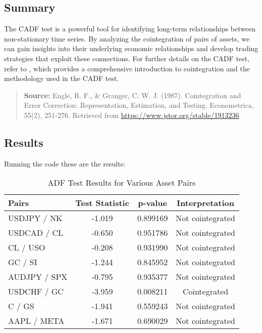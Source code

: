 \documentclass{article}
\begin{document}
\subsection{Summary}
The CADF test is a powerful tool for identifying long-term relationships between non-stationary time series. By analyzing the cointegration of pairs of assets, we can gain insights into their underlying economic relationships and develop trading strategies that exploit these connections.
For further details on the CADF test, refer to \textcite{engle1987cointegration}, which provides a comprehensive introduction to cointegration and the methodology used in the CADF test.

\begin{quote}
\textbf{Source:} Engle, R. F., \& Granger, C. W. J. (1987). Cointegration and Error Correction: Representation, Estimation, and Testing. Econometrica, 55(2), 251-276. Retrieved from \url{https://www.jstor.org/stable/1913236}
\end{quote}

\subsection*{Results}
Running the code these are the results:

\begin{table}[h!]
    \centering
    \begin{tabular}{|l|c|c|c|}
        \hline
        \textbf{Pairs} & \textbf{Test Statistic} & \textbf{p-value} & \textbf{Interpretation} \\
        \hline
        USDJPY / NK & -1.019 & 0.899169 & Not cointegrated \\
        \hline
        USDCAD / CL & -0.650 & 0.951786 & Not cointegrated \\
        \hline
        CL / USO & -0.208 & 0.931990 & Not cointegrated \\
        \hline
        GC / SI & -1.244 & 0.845952 & Not cointegrated \\
        \hline
        AUDJPY / SPX & -0.795 & 0.935377 & Not cointegrated \\
        \hline
        USDCHF / GC & -3.959 & 0.008211 & Cointegrated \\
        \hline
        C / GS & -1.941 & 0.559243 & Not cointegrated \\
        \hline
        AAPL / META & -1.671 & 0.690029 & Not cointegrated \\
        \hline
    \end{tabular}
    \caption{ADF Test Results for Various Asset Pairs}
    \label{tab:adf_results}
\end{table}
\end{document}
